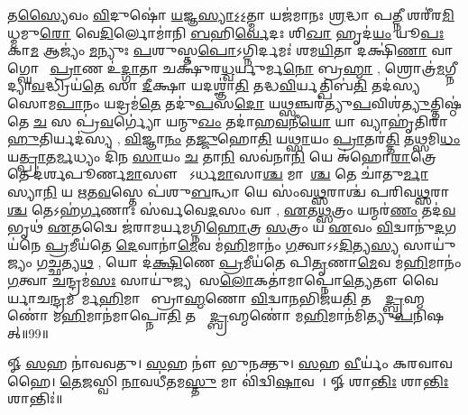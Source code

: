 𑌤\ul{𑌸𑍍𑌯𑍈}𑌵𑌂  \ul{𑌵𑌿}𑌦𑍁𑌷𑍋॑ \ul{𑌯}𑌜𑍍𑌞\ul{𑌸𑍍𑌯𑌾}𑌽॒𑌽॒𑌤𑍍𑌮𑌾 𑌯𑌜॑𑌮𑌾𑌨𑌃 \ul{𑌶𑍍𑌰}𑌦𑍍𑌧𑌾 𑌪\ul{𑌤𑍍𑌨𑍀} 𑌶𑌰𑍀॑𑌰\ul{𑌮𑌿}𑌧𑍍𑌮𑌮𑍁\ul{𑌰𑍋} 𑌵𑍇\ul{𑌦𑌿}𑌰𑍍𑌲𑍋𑌮𑌾॑𑌨𑌿 \ul{𑌬}\ar{}𑌹𑌿\ul{𑌰𑍍𑌵𑍇}𑌦𑌃 𑌶𑌿\ul{𑌖𑌾} 𑌹𑍃𑌦॑\ul{𑌯𑌂} 𑌯𑍂\ul{𑌪𑌃} 𑌕𑌾\ul{𑌮} 𑌆𑌜𑍍𑌯𑌂॑ \ul{𑌮}𑌨𑍍𑌯𑍁𑌃 \ul{𑌪}𑌶𑍁𑌸𑍍𑌤\ul{𑌪𑍋}𑌽𑌗𑍍𑌨𑌿𑌰𑍍𑌦𑌮𑌃॑ 𑌶𑌮\ul{𑌯𑌿}𑌤𑌾 𑌦𑌕𑍍𑌷𑌿॑\ul{𑌣𑌾} 𑌵𑌾𑌗𑍍𑌘𑍋𑌤𑌾᳚ \ul{𑌪𑍍𑌰𑌾}𑌣 𑌉॑\ul{𑌦𑍍𑌗𑌾}𑌤𑌾 𑌚𑌕𑍍𑌷𑍁॑𑌰\ul{𑌧𑍍𑌵}𑌰𑍍𑌯𑍁𑌰𑍍𑌮\ul{𑌨𑍋} 𑌬𑍍𑌰\ul{𑌹𑍍𑌮𑌾} \sep 
𑌶𑍍𑌰𑍋𑌤𑍍𑌰॑\ul{𑌮}𑌗𑍍𑌨𑍀𑌦𑍍𑌯𑌾\ul{𑌵}𑌦𑍍𑌧𑍍𑌰𑌿𑌯॑\ul{𑌤𑍇} 𑌸𑌾 \ul{𑌦𑍀}𑌕𑍍𑌷𑌾 𑌯𑌦𑌶𑍍𑌞𑌾॑\ul{𑌤𑌿} 𑌤𑌦𑍍𑌧\ul{𑌵𑌿}𑌰𑍍𑌯𑌤𑍍𑌪𑌿𑌬॑\ul{𑌤𑌿} 𑌤𑌦॑𑌸𑍍𑌯 𑌸𑍋𑌮\ul{𑌪𑌾}𑌨𑌂 𑌯𑌦𑍍𑌰𑌮॑\ul{𑌤𑍇} 𑌤𑌦𑍁॑\ul{𑌪}𑌸\ul{𑌦𑍋} 𑌯\ul{𑌥𑍍𑌸}𑌞𑍍𑌚𑌰॑𑌤𑍍𑌯𑍁\ul{𑌪}𑌵𑌿𑌶॑\ul{𑌤𑍍𑌯𑍁}𑌤𑍍𑌤𑌿𑌷𑍍𑌠॑𑌤𑍇 \ul{𑌚} 𑌸 𑌪𑍍𑌰॑\ul{𑌵}𑌰𑍍𑌗𑍍𑌯𑍋॑ 𑌯𑌨𑍍𑌮𑍁\ul{𑌖𑌂} 𑌤𑌦𑌾॑𑌹\ul{𑌵}𑌨𑍀\ul{𑌯𑍋} 𑌯𑌾 𑌵𑍍𑌯𑌾𑌹𑍃॑𑌤𑌿𑌰𑌾\ul{𑌹𑍁}𑌤𑌿𑌰𑍍𑌯𑌦॑𑌸𑍍𑌯 \sep 
\ul{𑌵𑌿}𑌜𑍍𑌞𑌾\ul{𑌨𑌂} 𑌤\ul{𑌜𑍍𑌜𑍁}𑌹𑍋\ul{𑌤𑌿} 𑌯\ul{𑌥𑍍𑌸𑌾}𑌯𑌂 \ul{𑌪𑍍𑌰𑌾}𑌤𑌰॑\ul{𑌤𑍍𑌤𑌿} 𑌤\ul{𑌥𑍍𑌸}𑌮𑌿\ul{𑌧𑌂} 𑌯\ul{𑌤𑍍𑌪𑍍𑌰𑌾}𑌤\ul{𑌰𑍍𑌮}𑌧𑍍𑌯𑌂 𑌦𑌿॑𑌨 \ul{𑌸𑌾}𑌯𑌂  \ul{𑌚} 𑌤𑌾\ul{𑌨𑌿} 𑌸𑌵॑𑌨𑌾\ul{𑌨𑌿} 𑌯𑍇 𑌅॑𑌹𑍋\ul{𑌰𑌾}𑌤𑍍𑌰𑍇 𑌤𑍇 𑌦॑𑌰𑍍\mbox{}𑌶𑌪𑍂𑌰𑍍𑌣\ul{𑌮𑌾}𑌸𑍗 𑌯𑍇᳚𑌽𑌰𑍍𑌧\ul{𑌮𑌾}𑌸𑌾\ul{𑌶𑍍𑌚} 𑌮𑌾𑌸𑌾᳚\ul{𑌶𑍍𑌚} 𑌤𑍇 𑌚𑌾॑𑌤𑍁\ul{𑌰𑍍𑌮𑌾}𑌸𑍍𑌯𑌾\ul{𑌨𑌿} 𑌯 \ul{𑌋}𑌤\ul{𑌵}𑌸𑍍𑌤𑍇 𑌪॑𑌶𑍁\ul{𑌬}𑌨𑍍𑌧𑌾 𑌯𑍇 𑌸𑌂॑𑌵\ul{𑌥𑍍𑌸}𑌰𑌾𑌶𑍍𑌚॑ 𑌪𑌰𑌿𑌵\ul{𑌥𑍍𑌸}𑌰𑌾\ul{𑌶𑍍𑌚} 𑌤𑍇𑌽𑌹॑\ul{𑌰𑍍𑌗}𑌣𑌾𑌃 𑌸॑𑌰𑍍𑌵𑌵𑍇\ul{𑌦}𑌸𑌂 𑌵𑌾 \sep 
\ul{𑌏}𑌤\ul{𑌥𑍍𑌸}𑌤𑍍𑌰𑌂 𑌯𑌨𑍍𑌮𑌰॑\ul{𑌣𑌂} 𑌤𑌦॑\ul{𑌵}𑌭𑍃𑌥॑ \ul{𑌏}𑌤𑌦𑍍𑌵𑍈 𑌜॑𑌰𑌾𑌮𑌰𑍍𑌯𑌮𑌗𑍍𑌨𑌿\ul{𑌹𑍋}𑌤𑍍𑌰 \ul{𑌸}𑌤𑍍𑌰𑌂 𑌯 \ul{𑌏}𑌵𑌂  \ul{𑌵𑌿}𑌦𑍍𑌵𑌾𑌨𑍁॑\ul{𑌦}𑌗𑌯॑𑌨𑍇 \ul{𑌪𑍍𑌰}𑌮𑍀𑌯॑𑌤𑍇 \ul{𑌦𑍇}𑌵𑌾𑌨𑌾॑\ul{𑌮𑍇}𑌵 𑌮॑\ul{𑌹𑌿}𑌮𑌾𑌨𑌂॑ \ul{𑌗}𑌤𑍍𑌵𑌾𑌽𑌽\ul{𑌦𑌿}𑌤𑍍𑌯\ul{𑌸𑍍𑌯} 𑌸𑌾𑌯𑍁॑𑌜𑍍𑌯𑌂 𑌗\ul{𑌚𑍍𑌛}𑌤𑍍𑌯\ul{𑌥} \sep
𑌯𑍋 𑌦॑\ul{𑌕𑍍𑌷𑌿}𑌣𑍇 \ul{𑌪𑍍𑌰}𑌮𑍀𑌯॑𑌤𑍇 𑌪𑌿\ul{𑌤𑍃}𑌣𑌾\ul{𑌮𑍇}𑌵 𑌮॑\ul{𑌹𑌿}𑌮𑌾𑌨𑌂॑ \ul{𑌗}𑌤𑍍𑌵𑌾 \ul{𑌚}𑌨𑍍𑌦𑍍𑌰𑌮॑\ul{𑌸𑌃} 𑌸𑌾𑌯𑍁॑𑌜𑍍𑌯 𑌸\ul{𑌲𑍋}𑌕𑌤𑌾॑𑌮𑌾𑌪𑍍𑌨𑍋\ul{𑌤𑍍𑌯𑍇}𑌤𑍗 𑌵𑍈 𑌸𑍂᳚𑌰𑍍𑌯𑌾𑌚\ul{𑌨𑍍𑌦𑍍𑌰}𑌮𑌸𑍋᳚𑌰𑍍𑌮\ul{𑌹𑌿}𑌮𑌾𑌨𑍗᳚ 𑌬𑍍𑌰𑌾\ul{𑌹𑍍𑌮}𑌣𑍋 \ul{𑌵𑌿}𑌦𑍍𑌵𑌾\ul{𑌨}𑌭𑌿𑌜॑𑌯\ul{𑌤𑌿} 𑌤𑌸𑍍𑌮𑌾᳚\ul{𑌦𑍍𑌬𑍍𑌰}𑌹𑍍𑌮𑌣𑍋॑ 𑌮\ul{𑌹𑌿}𑌮𑌾𑌨॑𑌮𑌾𑌪𑍍𑌨𑍋\ul{𑌤𑌿} 𑌤𑌸𑍍𑌮𑌾᳚\ul{𑌦𑍍𑌬𑍍𑌰}𑌹𑍍𑌮𑌣𑍋॑ 𑌮\ul{𑌹𑌿}𑌮𑌾𑌨॑𑌮𑌿𑌤𑍍𑌯𑍁\ul{𑌪}𑌨𑌿𑌷𑌤𑍍॥99॥
\anuvakamend

𑍐 \ul{𑌸}𑌹 𑌨𑌾॑𑌵𑌵𑌤𑍁। 
\ul{𑌸}𑌹 𑌨𑍗॑ 𑌭𑍁𑌨𑌕𑍍𑌤𑍁। 
\ul{𑌸}𑌹 \ul{𑌵𑍀}𑌰𑍍𑌯𑌂॑ 𑌕𑌰𑌵𑌾𑌵𑌹𑍈। 
\ul{𑌤𑍇}\ul{𑌜}𑌸𑍍𑌵𑌿 \ul{𑌨𑌾}𑌵𑌧𑍀॑𑌤𑌮\ul{𑌸𑍍𑌤𑍁} 𑌮𑌾 𑌵𑌿॑𑌦𑍍𑌵𑌿\ul{𑌷𑌾}𑌵𑌹𑍈᳚। 
𑍐 𑌶𑌾\ul{𑌨𑍍𑌤𑌿𑌃} 𑌶𑌾\ul{𑌨𑍍𑌤𑌿𑌃} 𑌶𑌾𑌨𑍍𑌤𑌿𑌃॑॥

\closesection
\clearpage
